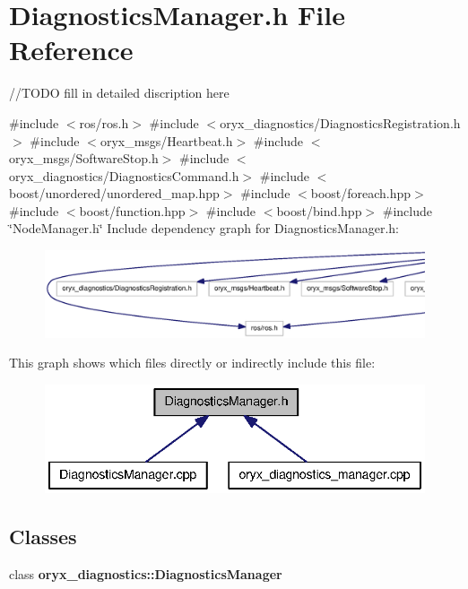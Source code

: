 \section{\-Diagnostics\-Manager.\-h \-File \-Reference}
\label{DiagnosticsManager_8h}


//\-T\-O\-D\-O fill in detailed discription here  


{\ttfamily \#include $<$ros/ros.\-h$>$}\*
{\ttfamily \#include $<$oryx\-\_\-diagnostics/\-Diagnostics\-Registration.\-h$>$}\*
{\ttfamily \#include $<$oryx\-\_\-msgs/\-Heartbeat.\-h$>$}\*
{\ttfamily \#include $<$oryx\-\_\-msgs/\-Software\-Stop.\-h$>$}\*
{\ttfamily \#include $<$oryx\-\_\-diagnostics/\-Diagnostics\-Command.\-h$>$}\*
{\ttfamily \#include $<$boost/unordered/unordered\-\_\-map.\-hpp$>$}\*
{\ttfamily \#include $<$boost/foreach.\-hpp$>$}\*
{\ttfamily \#include $<$boost/function.\-hpp$>$}\*
{\ttfamily \#include $<$boost/bind.\-hpp$>$}\*
{\ttfamily \#include \char`\"{}\-Node\-Manager.\-h\char`\"{}}\*
\-Include dependency graph for \-Diagnostics\-Manager.\-h\-:
\nopagebreak
\begin{figure}[H]
\begin{center}
\leavevmode
\includegraphics[width=350pt]{DiagnosticsManager_8h__incl}
\end{center}
\end{figure}
\-This graph shows which files directly or indirectly include this file\-:
\nopagebreak
\begin{figure}[H]
\begin{center}
\leavevmode
\includegraphics[width=338pt]{DiagnosticsManager_8h__dep__incl}
\end{center}
\end{figure}
\subsection*{\-Classes}
\begin{DoxyCompactItemize}
\item 
class {\bf oryx\-\_\-diagnostics\-::\-Diagnostics\-Manager}
\end{DoxyCompactItemize}
